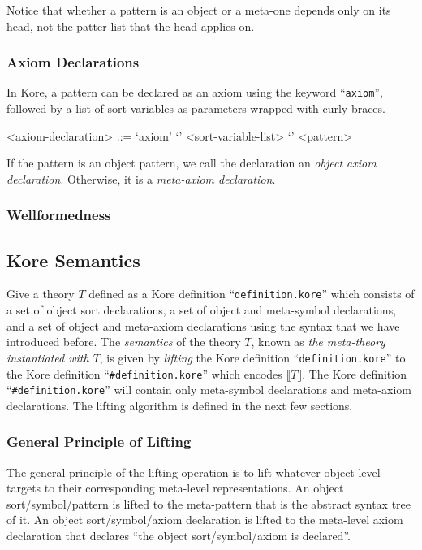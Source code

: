 \documentclass[UTF8,11pt]{article}
\theoremstyle{plain}
\theoremstyle{definition}
\theoremstyle{remark}
\newcommand{\denote}[1]{\llbracket{#1}\rrbracket}
\begin{document}
Notice that whether a pattern is an object or a meta-one depends only on its 
head, not the patter list that the head applies on.

\subsubsection{Axiom Declarations}
In Kore, a pattern can be declared as an axiom using the keyword 
``\verb|axiom|'', followed by a list of sort variables as parameters wrapped 
with curly braces.
\begin{grammar}\small
	 <axiom-declaration> ::= `axiom' `{' <sort-variable-list> `}' <pattern>
\end{grammar}
If the pattern is an object pattern, we call the declaration an \emph{object 
axiom declaration}.
Otherwise, it is a \emph{meta-axiom declaration}.

\subsubsection{Wellformedness}
\label{sec:kore-syntax-wellformedness}

\subsection{Kore Semantics}
\label{sec:kore-semantics}
Give a theory $T$ defined as a Kore definition ``\verb|definition.kore|'' which 
consists of a set of object sort declarations, a set of object and meta-symbol 
declarations, and a set of object and meta-axiom declarations using the syntax 
that we have introduced before.
The \emph{semantics} of the theory $T$, known as \emph{the meta-theory instantiated with $T$}, is given by \emph{lifting} the Kore definition ``\verb|definition.kore|'' to the Kore definition ``\verb|#definition.kore|'' which encodes $\denote{T}$.
The Kore definition ``\verb|#definition.kore|'' will contain only meta-symbol 
declarations and meta-axiom declarations.
The lifting algorithm is defined in the next few sections.
\subsubsection{General Principle of Lifting}
The general principle of the lifting operation is to lift whatever object level 
targets to their corresponding meta-level representations.
An object sort/symbol/pattern is lifted to the meta-pattern that is the 
abstract syntax tree of it. 
An object sort/symbol/axiom declaration is lifted to the meta-level axiom 
declaration that declares ``the object sort/symbol/axiom is declared''.
\end{document}
